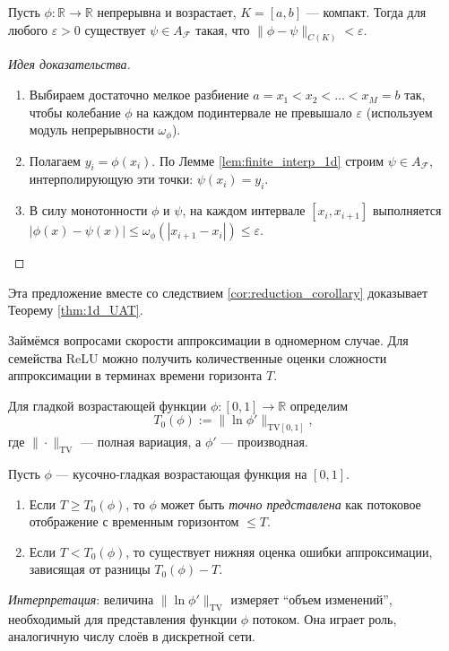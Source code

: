 \documentclass[../NDCNNAI_main.tex]{subfiles}
\begin{document}
\begin{proposition}
\label{prop:1d_density}
Пусть $\phi: \mathbb{R} \to \mathbb{R}$ непрерывна и возрастает, $K=[a,b]$ --- компакт. Тогда для любого $\varepsilon > 0$ существует $\psi \in A_{\mathcal{F}}$ такая, что $\| \phi - \psi \|_{C(K)} < \varepsilon$.
\end{proposition}
\begin{proof}[Идея доказательства]
\leavevmode
\begin{enumerate}
    \item Выбираем достаточно мелкое разбиение $a = x_1 < x_2 < \ldots < x_M = b$ так, чтобы колебание $\phi$ на каждом подинтервале не превышало $\varepsilon$ (используем модуль непрерывности $\omega_\phi$).
    \item Полагаем $y_i = \phi(x_i)$. По Лемме \ref{lem:finite_interp_1d} строим $\psi \in A_{\mathcal{F}}$, интерполирующую эти точки: $\psi(x_i) = y_i$.
    \item В силу монотонности $\phi$ и $\psi$, на каждом интервале $[x_i, x_{i+1}]$ выполняется $|\phi(x) - \psi(x)| \leq \omega_\phi(|x_{i+1} - x_i|) \leq \varepsilon$.
\end{enumerate}
\end{proof}
Эта предложение вместе со следствием \ref{cor:reduction_corollary} доказывает Теорему \ref{thm:1d_UAT}.

Займёмся вопросами скорости аппроксимации в одномерном случае.
Для семейства ReLU можно получить количественные оценки сложности аппроксимации в терминах времени горизонта $T$.
\begin{definition}
Для гладкой возрастающей функции $\phi: [0,1] \to \mathbb{R}$ определим
\[
T_0(\phi) := \| \ln \phi' \|_{\mathrm{TV}[0,1]},
\]
где $\|\cdot\|_{\mathrm{TV}}$ --- полная вариация, а $\phi'$ --- производная.
\end{definition}
\begin{proposition}
\label{prop:1d_complexity}
Пусть $\phi$ --- кусочно-гладкая возрастающая функция на $[0,1]$.
\begin{enumerate}
    \item Если $T \geq T_0(\phi)$, то $\phi$ может быть \emph{точно представлена} как потоковое отображение с временным горизонтом $\leq T$.
    \item Если $T < T_0(\phi)$, то существует нижняя оценка ошибки аппроксимации, зависящая от разницы $T_0(\phi) - T$.
\end{enumerate}
\end{proposition}
\textit{Интерпретация}: величина $\| \ln \phi' \|_{\mathrm{TV}}$ измеряет ``объем изменений'', необходимый для представления функции $\phi$ потоком. Она играет роль, аналогичную числу слоёв в дискретной сети.
\end{document}
